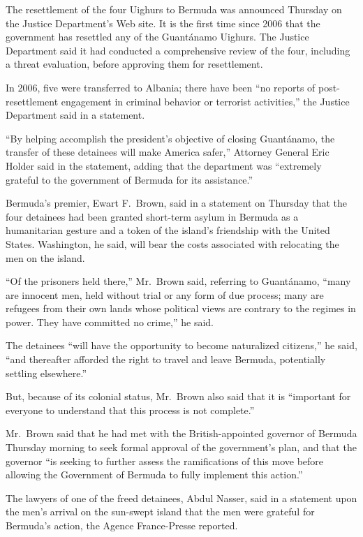 ﻿\documentclass[12pt,a4paper,onecolumn]{article}
\begin{document}
The resettlement of the four Uighurs to Bermuda was announced Thursday on the Justice Department's
Web site. It is the first time since 2006 that the government has resettled any of the Guant\'anamo
Uighurs. The Justice Department said it had conducted a comprehensive review of the four, including
a threat evaluation, before approving them for resettlement.

In 2006, five were transferred to Albania; there have been ``no reports of post-resettlement
engagement in criminal behavior or terrorist activities,'' the Justice Department said in a
statement.

``By helping accomplish the president's objective of closing Guant\'anamo, the transfer of these
detainees will make America safer,'' Attorney General Eric Holder said in the statement, adding that
the department was ``extremely grateful to the government of Bermuda for its assistance.''

Bermuda's premier, Ewart F.~Brown, said in a statement on Thursday that the four detainees had been
granted short-term asylum in Bermuda as a humanitarian gesture and a token of the island's
friendship with the United States. Washington, he said, will bear the costs associated with
relocating the men on the island.

``Of the prisoners held there,'' Mr.~Brown said, referring to Guant\'anamo, ``many are innocent men,
held without trial or any form of due process; many are refugees from their own lands whose
political views are contrary to the regimes in power. They have committed no crime,'' he said.

The detainees ``will have the opportunity to become naturalized citizens,'' he said, ``and
thereafter afforded the right to travel and leave Bermuda, potentially settling elsewhere.''

But, because of its colonial status, Mr.~Brown also said that it is ``important for everyone to
understand that this process is not complete.''

Mr.~Brown said that he had met with the British-appointed governor of Bermuda Thursday morning to
seek formal approval of the government's plan, and that the governor ``is seeking to further assess
the ramifications of this move before allowing the Government of Bermuda to fully implement this
action.''

The lawyers of one of the freed detainees, Abdul Nasser, said in a statement upon the men's arrival
on the sun-swept island that the men were grateful for Bermuda's action, the Agence France-Presse
reported.
\end{document}
